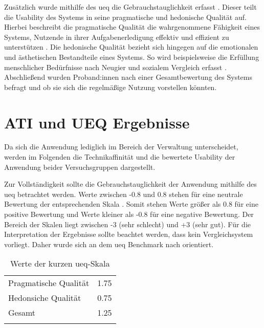Zusätzlich wurde mithilfe des \ac{ueq} die Gebrauchstauglichkeit erfasst
\cite{laugwitz2009subjektive}. Dieser teilt die Usability des Systems in seine
pragmatische und hedonische Qualität auf. Hierbei beschreibt die pragmatische
Qualität die wahrgenommene Fähigkeit eines Systems, Nutzende in ihrer
Aufgabenerledigung effektiv und effizient zu unterstützen
\cite{hassenzahl_thing_2004}. Die hedonische Qualität bezieht sich hingegen auf
die emotionalen und ästhetischen Bestandteile eines Systems. So wird
beispielsweise die Erfüllung menschlicher Bedürfnisse nach Neugier und sozialem
Vergleich erfasst \cite{hassenzahl_thing_2004}. Abschließend wurden
Proband:innen nach einer Gesamtbewertung des Systems befragt und ob sie sich die
regelmäßige Nutzung vorstellen könnten.



\section{ATI und UEQ Ergebnisse}
\label{sec:prese}
Da sich die Anwendung lediglich im Bereich der Verwaltung unterscheidet, werden im
Folgenden die Technikaffinität und die bewertete Usability der Anwendung beider
Versuchsgruppen dargestellt.

Zur Vollständigkeit sollte die Gebrauchstauglichkeit der Anwendung mithilfe des
\ac{ueq} betrachtet werden. Werte zwischen -0.8 und 0.8 stehen für eine neutrale
Bewertung der entsprechenden Skala \cite{schrepp2018user}. Somit stehen Werte
größer als 0.8 für eine positive Bewertung und Werte kleiner als -0.8 für eine
negative Bewertung. Der Bereich der Skalen liegt zwischen -3 (sehr schlecht) und
+3 (sehr gut). Für die Interpretation der Ergebnisse sollte beachtet werden,
dass kein Vergleichsystem vorliegt. Daher wurde sich an dem \ac{ueq} Benchmark
nach  orientiert. 
\begin{table}[h]
        \centering
        \caption{Werte der kurzen \ac{ueq}-Skala}
        \begin{tabular}{lc}
                \arrayrulecolor{maincolor}\hline
                Pragmatische Qualität & 1.75 \\
                Hedonsiche Qualität   & 0.75 \\
                Gesamt                & 1.25 \\
                \arrayrulecolor{maincolor}\hline
        \end{tabular}
        \label{table:ueq}
\end{table}

